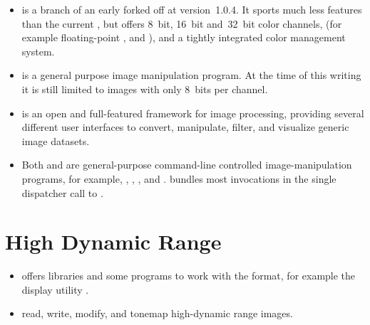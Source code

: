 \begin{itemize}
  \label{app:cinepaint}
\item
   is a branch of an early
   forked off at version~1.0.4.  It sports much less features than the current
  , but offers 8~bit, 16~bit and~32~bit color channels,  (for
  example floating-point , and ), and a tightly integrated color
  management system.

  \label{app:gimp}
\item
   is a general purpose image manipulation
  program.  At the time of this writing it is still limited to images with only 8~bits per
  channel.

  \label{app:gmic}
\item
   is an open and full-featured
  framework for image processing, providing several different user interfaces to convert,
  manipulate, filter, and visualize generic image datasets.

  \label{app:imagemagick}\label{app:graphicsmagick}
\item
  Both  and
   are
  general\hyp{}purpose command\hyp{}line controlled image\hyp{}manipulation programs, for
  example, , , , and .   bundles most
   invocations in the single dispatcher call to .
\end{itemize}


\section[High Dynamic Range]{\label{sec:high-dynamic-range}%
  High Dynamic Range}

\begin{itemize}
  \label{lib:openexr}
\item
   offers libraries and some
  programs to work with the 
   format, for example the  display utility
  .

  \label{app:psftools}
\item
   read, write, modify, and tonemap
  high-dynamic range images.
\end{itemize}


